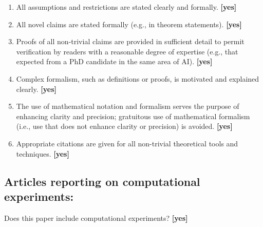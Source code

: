 \begin{enumerate}
    \item All assumptions and restrictions are stated clearly and formally.
    \textbf{[yes]}
    \item All novel claims are stated formally (e.g., in theorem statements).
    \textbf{[yes]}
    \item Proofs of all non-trivial claims are provided in sufficient detail to
    permit verification by readers with a reasonable degree of expertise (e.g.,
    that expected from a PhD candidate in the same area of AI).
    \textbf{[yes]}
    \item
    Complex formalism, such as definitions or proofs, is motivated and
    explained clearly. \textbf{[yes]}
    \item
    The use of mathematical notation and formalism serves the purpose of
    enhancing clarity and precision; gratuitous use of mathematical formalism
    (i.e., use that does not enhance clarity or precision) is avoided.
    \textbf{[yes]}
    \item
    Appropriate citations are given for all non-trivial theoretical tools and
    techniques. \textbf{[yes]}
\end{enumerate}

\subsection*{Articles reporting on computational experiments:}
Does this paper include computational experiments? \textbf{[yes]}

